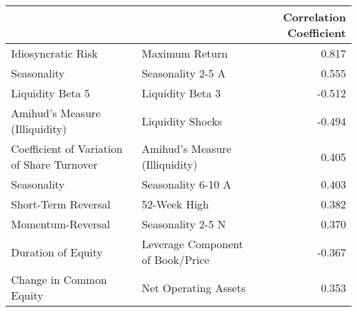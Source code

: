 \begin{tabular}{llr}
\toprule
                        &                      &  Correlation Coefficient \\
\midrule
Idiosyncratic Risk & Maximum Return &                    0.817 \\
Seasonality & Seasonality 2-5 A &                    0.555 \\
Liquidity Beta 5 & Liquidity Beta 3 &                   -0.512 \\
Amihud's Measure (Illiquidity) & Liquidity Shocks &                   -0.494 \\
Coefficient of Variation of Share Turnover & Amihud's Measure (Illiquidity) &                    0.405 \\
Seasonality & Seasonality 6-10 A &                    0.403 \\
Short-Term Reversal & 52-Week High &                    0.382 \\
Momentum-Reversal & Seasonality 2-5 N &                    0.370 \\
Duration of Equity & Leverage Component of Book/Price &                   -0.367 \\
Change in Common Equity & Net Operating Assets &                    0.353 \\
\bottomrule
\end{tabular}

